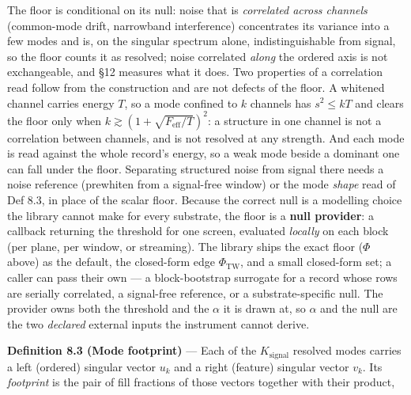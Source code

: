 \documentclass[10pt,letterpaper,twocolumn]{article}
\begin{document}
The floor is conditional on its null: noise that is \emph{correlated across channels} (common-mode drift, narrowband interference) concentrates its variance into a few modes and is, on the singular spectrum alone, indistinguishable from signal, so the floor counts it as resolved; noise correlated \emph{along} the ordered axis is not exchangeable, and §12 measures what it does. Two properties of a correlation read follow from the construction and are not defects of the floor. A whitened channel carries energy \(T\), so a mode confined to \(k\) channels has \(s^2\le kT\) and clears the floor only when \(k\gtrsim(1+\sqrt{F_{\mathrm{eff}}/T})^2\): a structure in one channel is not a correlation between channels, and is not resolved at any strength. And each mode is read against the whole record's energy, so a weak mode beside a dominant one can fall under the floor. Separating structured noise from signal there needs a noise reference (prewhiten from a signal-free window) or the mode \emph{shape} read of Def 8.3, in place of the scalar floor. Because the correct null is a modelling choice the library cannot make for every substrate, the floor is a \textbf{null provider}: a callback returning the threshold for one screen, evaluated \emph{locally} on each block (per plane, per window, or streaming). The library ships the exact floor (\(\Phi\) above) as the default, the closed-form edge \(\Phi_{\mathrm{TW}}\), and a small closed-form set; a caller can pass their own --- a block-bootstrap surrogate for a record whose rows are serially correlated, a signal-free reference, or a substrate-specific null. The provider owns both the threshold and the \(\alpha\) it is drawn at, so \(\alpha\) and the null are the two \emph{declared} external inputs the instrument cannot derive.

\textbf{Definition 8.3 (Mode footprint)} --- Each of the \(K_{\mathrm{signal}}\) resolved modes carries a left (ordered) singular vector \(u_k\) and a right (feature) singular vector \(v_k\). Its \emph{footprint} is the pair of fill fractions of those vectors together with their product,

\end{document}
